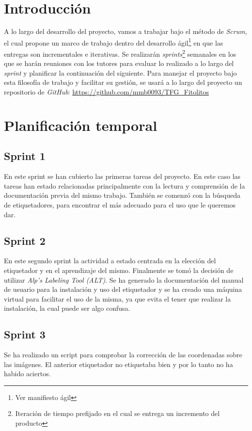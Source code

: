 
\section{Introducción}
A lo largo del desarrollo del proyecto, vamos a trabajar bajo el método de \textit{Scrum}, el cual propone un marco de trabajo dentro del desarrollo ágil\footnote{Ver manifiesto ágil} en que las entregas son incrementales e iterativas. Se realizarán \textit{sprints}\footnote{Iteración de tiempo prefijado en el cual se entrega un incremento del producto} semanales en los que se harán reuniones con los tutores para evaluar lo realizado a lo largo del \textit{sprint} y planificar la continuación del siguiente.
Para manejar el proyecto bajo esta filosofía de trabajo y facilitar su gestión, se usará a lo largo del proyecto un repositorio de \textit{GitHub}: \url{https://github.com/mmb0093/TFG_Fitolitos}

\section{Planificación temporal}
\subsection{Sprint 1}
En este sprint se han cubierto las primeras tareas del proyecto. En este caso las tareas han estado relacionadas principalmente con la lectura y comprensión de la documentación previa del mismo trabajo.
También se comenzó con la búsqueda de etiquetadores, para encontrar el más adecuado para el uso que le queremos dar.
\subsection{Sprint 2}
En este segundo sprint la actividad a estado centrada en la elección del etiquetador y en el aprendizaje del mismo. Finalmente se tomó la decisión de utilizar \textit{Alp’s Labeling Tool (ALT)}. 
Se ha generado la documentación del manual de usuario para la instalación y uso del etiquetador y se ha creado una máquina virtual para facilitar el uso de la misma, ya que evita el tener que realizar la instalación, la cual puede ser algo confusa.
\subsection{Sprint 3}
Se ha realizado un script para comprobar la corrección de las coordenadas sobre las imágenes. El anterior etiquetador no etiquetaba bien y por lo tanto no ha habido aciertos.
